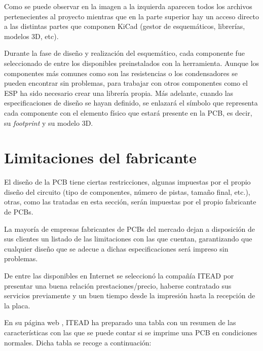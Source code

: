 Como se puede observar en la imagen a la izquierda aparecen todos los archivos pertenecientes al proyecto mientras que en la parte superior hay un acceso directo a las distintas partes que componen KiCad (gestor de esquemáticos, librerías, modelos 3D, etc).

Durante la fase de diseño y realización del esquemático, cada componente fue seleccionado de entre los disponibles preinstalados con la herramienta. Aunque los componentes más comunes como son las resistencias o los condensadores se pueden encontrar sin problemas, para trabajar con otros componentes como el ESP ha sido necesario crear una librería propia. Más adelante, cuando las especificaciones de diseño se hayan definido, se enlazará el símbolo que representa cada componente con el elemento físico que estará presente en la \acrshort{PCB}, es decir, su \textit{footprint} y su modelo 3D.

\section{Limitaciones del fabricante\label{sec:ITEAD_PCB}}

El diseño de la PCB tiene ciertas restricciones, algunas impuestas por el propio diseño del circuito (tipo de componentes, número de pistas, tamaño final, etc.), otras, como las tratadas en esta sección, serán impuestas por el propio fabricante de \acrshort{PCB}s.

La mayoría de empresas fabricantes de PCBs del mercado dejan a disposición de sus clientes un listado de las limitaciones con las que cuentan, garantizando que cualquier diseño que se adecue a dichas especificaciones será impreso sin problemas. 

De entre las disponibles en Internet se seleccionó la compañía ITEAD por presentar una buena relación prestaciones/precio, haberse contratado sus servicios previamente y un buen tiempo desde la impresión hasta la recepción de la placa.

En su página web \cite{ITEAD_PCB_Limitations}, ITEAD ha preparado una tabla con un resumen de las características con las que se puede contar si se imprime una PCB en condiciones normales. Dicha tabla se recoge a continuación:

